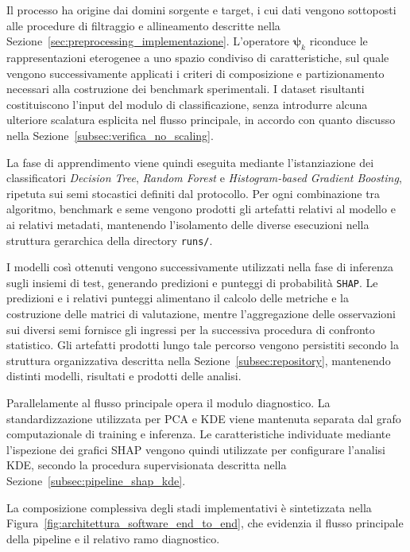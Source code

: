 Il processo ha origine dai domini sorgente e target, i cui dati vengono sottoposti alle procedure di filtraggio e allineamento descritte nella Sezione~\ref{sec:preprocessing_implementazione}.
L'operatore $\boldsymbol{\psi}_k$ riconduce le rappresentazioni eterogenee a uno spazio condiviso di caratteristiche, sul quale vengono successivamente applicati i criteri di composizione e partizionamento necessari alla costruzione dei benchmark sperimentali.
I dataset risultanti costituiscono l'input del modulo di classificazione, senza introdurre alcuna ulteriore scalatura esplicita nel flusso principale, in accordo con quanto discusso nella Sezione~\ref{subsec:verifica_no_scaling}.
 
La fase di apprendimento viene quindi eseguita mediante l'istanziazione dei classificatori \textit{Decision Tree}, \textit{Random Forest} e \textit{Histogram-based Gradient Boosting}, ripetuta sui semi stocastici definiti dal protocollo.
Per ogni combinazione tra algoritmo, benchmark e seme vengono prodotti gli artefatti relativi al modello e ai relativi metadati, mantenendo l'isolamento delle diverse esecuzioni nella struttura gerarchica della directory \texttt{runs/}.
 
I modelli così ottenuti vengono successivamente utilizzati nella fase di inferenza sugli insiemi di test, generando predizioni e punteggi di probabilità \texttt{SHAP}.
Le predizioni e i relativi punteggi alimentano il calcolo delle metriche e la costruzione delle matrici di valutazione, mentre l'aggregazione delle osservazioni sui diversi semi fornisce gli ingressi per la successiva procedura di confronto statistico.
Gli artefatti prodotti lungo tale percorso vengono persistiti secondo la struttura organizzativa descritta nella Sezione~\ref{subsec:repository}, mantenendo distinti modelli, risultati e prodotti delle analisi.
 
Parallelamente al flusso principale opera il modulo diagnostico.
La standardizzazione utilizzata per PCA e KDE viene mantenuta separata dal grafo computazionale di training e inferenza.
Le caratteristiche individuate mediante l'ispezione dei grafici SHAP vengono quindi utilizzate per configurare l'analisi KDE, secondo la procedura supervisionata descritta nella Sezione~\ref{subsec:pipeline_shap_kde}.
 
La composizione complessiva degli stadi implementativi è sintetizzata nella Figura~\ref{fig:architettura_software_end_to_end}, che evidenzia il flusso principale della pipeline e il relativo ramo diagnostico.
 
